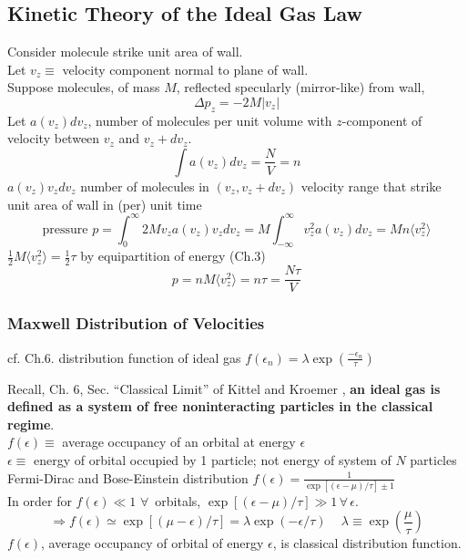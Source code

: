 \documentclass[10pt]{amsart}
\begin{document}
\begin{multicols*}{2}
\subsection*{Kinetic Theory of the Ideal Gas Law}

Consider molecule strike unit area of wall. \\
Let $v_z \equiv $ velocity component normal to plane of wall. \\
Suppose molecules, of mass $M$, reflected specularly (mirror-like) from wall,
\[
\Delta p_z = -2M|v_z|
\]
Let $a(v_z)dv_z$, number of molecules per unit volume with $z$-component of velocity between $v_z$ and $v_z + dv_z$.  
\[
\int a(v_z)dv_z = \frac{N}{V} = n
\]
$a(v_z) v_z dv_z$ number of molecules in $(v_z, v_z + dv_z)$  velocity range that strike unit area of wall in (per) unit time
\[
\text{pressure } p = \int_0^{\infty}2M v_za(v_z)v_z dv_z = M\int_{-\infty}^{\infty}v_z^2 a(v_z) dv_z = Mn\langle v_z^2 \rangle
\]
$\frac{1}{2}M\langle v_z^2 \rangle = \frac{1}{2} \tau$ by equipartition of energy (Ch.3)
\[
p = nM \langle v_z^2 \rangle = n\tau = \frac{N\tau}{V}
\]
\subsubsection*{Maxwell Distribution of Velocities}  

cf. Ch.6. distribution function of ideal gas $f(\epsilon_n) = \lambda \exp{ \left( \frac{-\epsilon_n}{\tau} \right)}$

Recall, Ch. 6, Sec. ``Classical Limit'' of Kittel and Kroemer \cite{CKittelHKroemer1980}, \textbf{an ideal gas is defined as a system of free noninteracting particles in the classical regime}.  \\
$f(\epsilon) \equiv $ average occupancy of an orbital at energy $\epsilon$ \\
$\epsilon \equiv $ energy of orbital occupied by 1 particle; not energy of system of $N$ particles \\
Fermi-Dirac and Bose-Einstein distribution $f(\epsilon) = \frac{1}{ \exp{ [ (\epsilon - \mu )/\tau ] } \pm 1 }$ \\
In order for $f(\epsilon) \ll 1$ $\forall \, $ orbitals, $\exp{ [ (\epsilon-\mu)/\tau ] } \gg 1\, \forall \, \epsilon$.  
\[
\Longrightarrow f(\epsilon) \simeq \exp{ [(\mu - \epsilon )/\tau]} = \lambda \exp{ (-\epsilon/\tau)} \quad \, \lambda \equiv \exp{ \left( \frac{ \mu }{\tau} \right) }
\]
$f(\epsilon)$, average occupancy of orbital of energy $\epsilon$, is classical distribution function.  


\end{multicols*}
\end{document}
